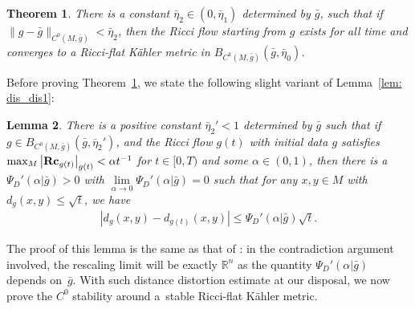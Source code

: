 \documentclass[10pt,a4paper]{amsart}
\numberwithin{equation}{section}
\newtheorem{Theorem}{Theorem}[section]
\newtheorem{Lemma}[Theorem]{Lemma}
\newcommand{\Rc}{\operatorname{\bf Rc}}
\begin{document}
\begin{Theorem}\label{thm: main2}
There is a constant $\bar{\eta}_2\in (0,\bar{\eta}_1)$
determined by $\bar{g}$, such that if $\|g-\bar{g}
\|_{C^0(M,\bar{g})} <\bar{\eta}_2$, then the Ricci
flow starting from $g$ exists for all time and converges to a Ricci-flat
K\"ahler metric in $B_{C^{k}(M,\bar{g})}(\bar{g},\bar{\eta}_0)$.
\end{Theorem}

Before proving Theorem~\ref{thm: main2}, we state the following slight variant
of Lemma~\ref{lem: dis_dis1}:
 \begin{Lemma} \label{lem: dis_dis}
 There is a positive constant $\bar{\eta}_2'<1$ determined by $\bar{g}$ such
 that if $g\in B_{C^0(M,\bar{g})}(\bar{g},\bar{\eta}_2')$, and the Ricci flow
 $g(t)$ with initial data $g$ satisfies $\max_M\left|\Rc_{g(t)} \right|_{g(t)}
 <\alpha t^{-1}$ for $t\in [0,T)$ and some $\alpha\in (0,1)$, then there is a
 $\Psi_D'(\alpha|\bar{g})>0$ with $\lim\limits_{\alpha\to 0}\Psi_D'(\alpha|\bar{g})=0$
 such that for any $x,y\in M$ with $d_g(x,y)\le \sqrt{t}$, we have
 \begin{align*}
 |d_g(x,y)-d_{g(t)}(x,y) | \le \Psi_D'(\alpha|\bar{g})\sqrt{t}.
 \end{align*}
\end{Lemma}
The proof of this lemma is the same as that of \cite[Lemma~2.10]{CRX19}: in
the contradiction argument involved, the rescaling limit will be exactly
$\mathbb{R}^n$ as the quantity $\Psi_D'(\alpha|\bar{g})$ depends on~$\bar{g}$.
With such distance distortion estimate at our disposal, we now prove the $C^0$
stability around a~stable Ricci-flat K\"ahler metric.
\end{document}
